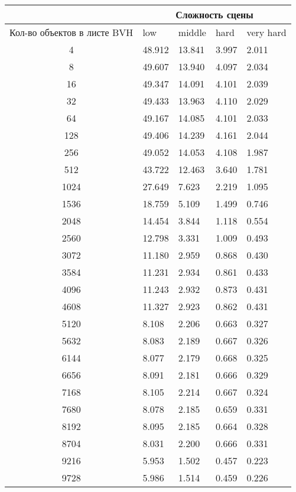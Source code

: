 \begin{center}
\begin{longtable}{|c|p{2cm}|p{2cm}|p{2cm}|p{2cm}|}
\hline & \multicolumn{4}{c|}{Сложность сцены} \\ 
\hline Кол-во объектов в листе BVH & low & middle & hard &  very hard\\ 
\hline 4 &  48.912 & 13.841 & 3.997 & 2.011 \\ 
\hline 8 &  49.607 & 13.940 & 4.097 & 2.034 \\ 
\hline 16 &  49.347 & 14.091 & 4.101 & 2.039 \\ 
\hline 32 &  49.433 & 13.963 & 4.110 & 2.029 \\ 
\hline 64 &  49.167 & 14.085 & 4.101 & 2.033 \\ 
\hline 128 &  49.406 & 14.239 & 4.161 & 2.044 \\ 
\hline 256 &  49.052 & 14.053 & 4.108 & 1.987 \\ 
\hline 512 &  43.722 & 12.463 & 3.640 & 1.781 \\ 
\hline 1024 &  27.649 & 7.623 & 2.219 & 1.095 \\ 
\hline 1536 &  18.759 & 5.109 & 1.499 & 0.746 \\ 
\hline 2048 &  14.454 & 3.844 & 1.118 & 0.554 \\ 
\hline 2560 &  12.798 & 3.331 & 1.009 & 0.493 \\ 
\hline 3072 &  11.180 & 2.959 & 0.868 & 0.430 \\ 
\hline 3584 &  11.231 & 2.934 & 0.861 & 0.433 \\ 
\hline 4096 &  11.243 & 2.932 & 0.873 & 0.431 \\ 
\hline 4608 &  11.327 & 2.923 & 0.862 & 0.431 \\ 
\hline 5120 &  8.108 & 2.206 & 0.663 & 0.327 \\ 
\hline 5632 &  8.083 & 2.189 & 0.667 & 0.326 \\ 
\hline 6144 &  8.077 & 2.179 & 0.668 & 0.325 \\ 
\hline 6656 &  8.091 & 2.181 & 0.666 & 0.329 \\ 
\hline 7168 &  8.105 & 2.214 & 0.667 & 0.324 \\ 
\hline 7680 &  8.078 & 2.185 & 0.659 & 0.331 \\ 
\hline 8192 &  8.095 & 2.185 & 0.664 & 0.328 \\ 
\hline 8704 &  8.031 & 2.200 & 0.666 & 0.331 \\ 
\hline 9216 &  5.953 & 1.502 & 0.457 & 0.223 \\ 
\hline 9728 &  5.986 & 1.514 & 0.459 & 0.226 \\ 

\end{longtable}
\end{center}

